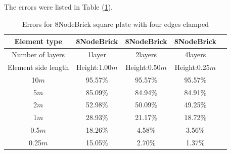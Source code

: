 \documentclass[fleqn,11pt]{article}
\begin{document}
The errors were listed in Table (\ref{table Errors for 8NodeBrick square plate with four edges clamped}).

\begin{table}[H]
  \centering
  \caption{Errors for 8NodeBrick square plate with four edges clamped}
  \label{table Errors for 8NodeBrick square plate with four edges clamped}
\begin{tabular}{|c|c|c|c|c|}
\hline
Element type     & 8NodeBrick     & 8NodeBrick     & 8NodeBrick      \\ \hline
Number of layers & 1layer         & 2layers         & 4layers          \\ \hline
Element side length & Height:1.00$m$ & Height:0.50$m$ & Height:0.25$m$  \\ \hline
10$m$            & 95.57\%        & 95.57\%        & 95.57\%        \\ \hline
5$m$             & 85.09\%        & 84.94\%        & 84.91\%        \\ \hline
2$m$             & 52.98\%        & 50.09\%        & 49.25\%        \\ \hline
1$m$             & 28.93\%        & 21.17\%        & 18.72\%        \\ \hline
0.5$m$           & 18.26\%        & 4.58\%         & 3.56\%         \\ \hline
0.25$m$          & 15.05\%        & 2.70\%         & 1.37\%         \\
\hline
\end{tabular}
\end{table}



\end{document}
